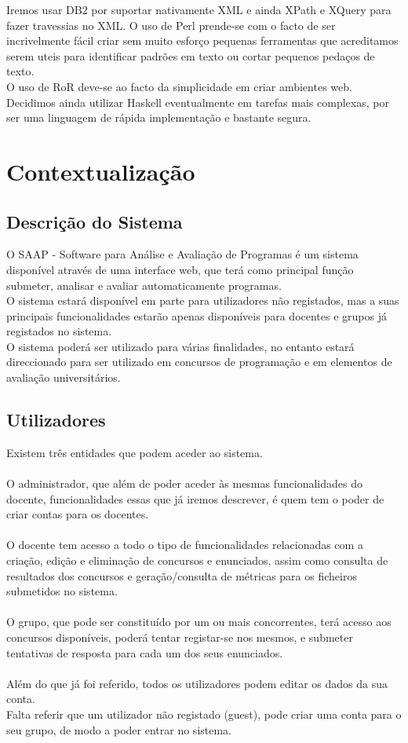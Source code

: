 Iremos usar DB2 por suportar nativamente XML e ainda XPath e XQuery para fazer travessias no XML. O uso de Perl prende-se com o facto de ser incrivelmente fácil criar
sem muito esforço pequenas ferramentas que acreditamos serem uteis para identificar padrões em texto ou cortar pequenos pedaços de texto.\\
O uso de RoR deve-se ao facto da simplicidade em criar ambientes web. Decidimos ainda utilizar Haskell eventualmente em tarefas mais complexas, por ser uma linguagem de rápida
implementação e bastante segura.


\section{Contextualização}
\subsection{Descrição do Sistema}
O SAAP - Software para Análise e Avaliação de Programas é um sistema disponível através de uma interface web, que terá como principal função 
submeter, analisar e avaliar automaticamente programas.\\
O sistema estará disponível em parte para utilizadores não registados, mas a suas principais funcionalidades estarão apenas disponíveis para docentes 
e grupos já registados no sistema.\\
O sistema poderá ser utilizado para várias finalidades, no entanto estará direccionado para ser utilizado em concursos de programação e em elementos 
de avaliação universitários.

\subsection{Utilizadores}
Existem três entidades que podem aceder ao sistema.\\ \\
O administrador, que além de poder aceder às mesmas funcionalidades do docente, funcionalidades essas que já iremos descrever, é quem tem o poder de
criar contas para os docentes.\\
\\
O docente tem acesso a todo o tipo de funcionalidades relacionadas com a criação, edição e eliminação de concursos e enunciados, assim como consulta
de resultados dos concursos e geração/consulta de métricas para os ficheiros submetidos no sistema.\\
\\
O grupo, que pode ser constituído por um ou mais concorrentes, terá acesso aos concursos disponíveis, poderá tentar registar-se nos mesmos, e submeter
tentativas de resposta para cada um dos seus enunciados.\\
\\
Além do que já foi referido, todos os utilizadores podem editar os dados da sua conta.\\ 
Falta referir que um utilizador não registado (guest), pode criar uma conta para o seu grupo, de modo a poder entrar no sistema.

